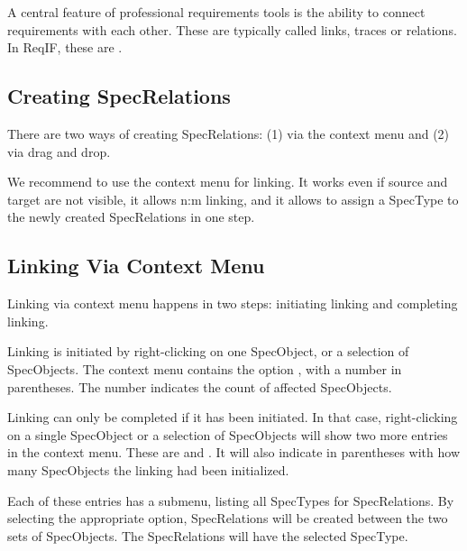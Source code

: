 A central feature of professional requirements tools is the ability to connect requirements with each other.  These are typically called links, traces or relations.  In ReqIF, these are .

\subsection{Creating SpecRelations}

There are two ways of creating SpecRelations: (1) via the context menu and (2) via drag and drop.

\begin{info}
We recommend to use the context menu for linking.  It works even if source and target are not visible, it allows n:m linking, and it allows to assign a SpecType to the newly created SpecRelations in one step.
\end{info}



\subsection{Linking Via Context Menu}

Linking via context menu happens in two steps: initiating linking and completing linking.

Linking is initiated by right-clicking on one SpecObject, or a selection of SpecObjects.  The context menu contains the option , with a number in parentheses. The number indicates the count of affected SpecObjects.

Linking can only be completed if it has been initiated.  In that case, right-clicking on a single SpecObject or a selection of SpecObjects will show two more entries in the context menu.  These are  and .  It will also indicate in parentheses with how many SpecObjects the linking had been initialized.

Each of these entries has a submenu, listing all SpecTypes for SpecRelations.  By selecting the appropriate option, SpecRelations will be created between the two sets of SpecObjects.  The SpecRelations will have the selected SpecType.

